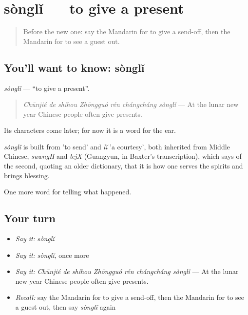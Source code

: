\section[sònglǐ]{sònglǐ — to give a present}

\label{lesson:ZH-C336-songli}



\begin{quote}
Before the new one: say the Mandarin for to give a send-off, then the Mandarin for to see a guest out.
\end{quote}

\subsection*{You'll want to know: sònglǐ}
\emph{sònglǐ} — \textquotedblleft{}to give a present\textquotedblright{}.

\begin{quote}
\emph{Chūnjié de shíhou Zhōngguó rén chángcháng sònglǐ} — At the lunar new year Chinese people often give presents.
\end{quote}

Its characters come later; for now it is a word for the ear.

\begin{cousinweb}
\emph{sònglǐ} is built from  'to send' and \emph{lǐ} 'a courtesy', both inherited from Middle Chinese, \emph{suwngH} and \emph{lejX} (Guangyun, in Baxter's transcription), which says of the second, quoting an older dictionary, that it is how one serves the spirits and brings blessing.
\end{cousinweb}

\begin{grammarlens}[title={What you've built}]
One more word for telling what happened.
\end{grammarlens}

\subsection*{Your turn}
\begin{itemize}
\raggedright
  \item \emph{Say it:} \emph{sònglǐ}
  \item \emph{Say it:} \emph{sònglǐ}, once more
  \item \emph{Say it:} \emph{Chūnjié de shíhou Zhōngguó rén chángcháng sònglǐ} — At the lunar new year Chinese people often give presents.
  \item \emph{Recall:} say the Mandarin for to give a send-off, then the Mandarin for to see a guest out, then say \emph{sònglǐ} again
\end{itemize}

